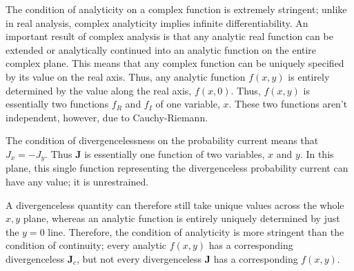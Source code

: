 The condition of analyticity on a complex function is extremely stringent;
unlike in real analysis, complex analyticity implies infinite differentiability.
An important result of complex analysis is that any analytic real function can
be extended or analytically continued into an analytic function on the entire
complex plane. This means that any complex function can be uniquely specified by
its value on the real axis. Thus, any analytic function $f(x,y)$ is entirely
determined by the value along the real axis, $f(x,0)$. Thus, $f(x,y)$ is
essentially two functions $f_R$ and $f_I$ of one variable, $x$. These two
functions aren't independent, however, due to Cauchy-Riemann.

The condition of divergencelessness on the probability current means that $J_x =
- J_y$. Thus $\mathbf{J}$ is essentially one function of two variables, $x$ and
$y$. In this plane, this single function representing the divergenceless
probability current can have any value; it is unrestrained.

A divergenceless quantity can therefore still take unique values across the
whole $x,y$ plane, whereas an analytic function is entirely uniquely determined
by just the $y = 0$ line. Therefore, the condition of analyticity is more
stringent than the condition of continuity; every analytic $f(x,y)$ has a
corresponding divergenceless $\mathbf{J}_c$, but not every divergenceless
$\mathbf{J}$ has a corresponding $f(x,y)$.
